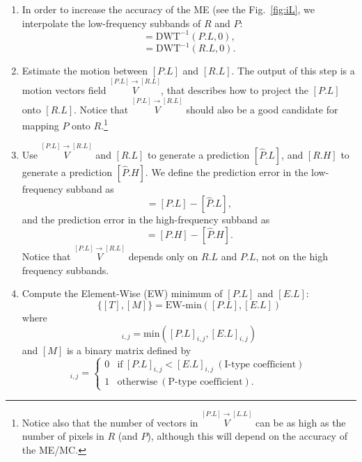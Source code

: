 \begin{enumerate}

\item In order to increase the accuracy of the ME (see the
  Fig.~\ref{fig:iL}, we interpolate the low-frequency subbands of $R$
  and $P$:
  \begin{equation}
    [P.L] = \text{DWT}^{-1}(P.L, 0),
  \end{equation}
  \begin{equation}
    [R.L] = \text{DWT}^{-1}(R.L, 0).
  \end{equation}

\item Estimate the motion between $[P.L]$ and $[R.L]$.
  The output of this step is a motion vectors field
  $\overset{[P.L]\rightarrow [R.L]}{V}$, that describes how to project
  the $[P.L]$ onto $[R.L]$. Notice that $\overset{[P.L]\rightarrow
  [R.L]}{V}$ should also be a good candidate for mapping $P$ onto
  $R$.\footnote{Notice also that the number of vectors in
  $\overset{[P.L]\rightarrow [L.L]}{V}$ can be as high as the number
  of pixels in $R$ (and $P$), although this will depend on the
  accuracy of the ME/MC.}
  
\item Use $\overset{[P.L]\rightarrow [R.L]}{V}$ and $[R.L]$ to
  generate a prediction $[\hat{P}.L]$, and $[R.H]$ to generate a
  prediction $[\hat{P}.H]$. We define the prediction error in the
  low-frequency subband as
  \begin{equation}
    [E.L] = [P.L] - [\hat{P}.L],
    \label{eq:prediction_error_L}
  \end{equation}
  and the prediction error in the high-frequency subband
  as
  \begin{equation}
    [E.H] = [P.H] - [\hat{P}.H].
    \label{eq:prediction_error}
  \end{equation}
  Notice that $\overset{[P.L]\rightarrow [R.L]}{V}$ depends only on
  $R.L$ and $P.L$, not on the high frequency subbands.

\item Compute the Element-Wise (EW) minimum of $[P.L]$ and $[E.L]$:
  \begin{equation}
    \{[T],[M]\} = \text{EW-min}([P.L], [E.L])
    \label{eq:EW-min}
  \end{equation}
  where
  \begin{equation}
    [T]_{i,j}=\text{min}([P.L]_{i,j}, [E.L]_{i,j})
  \end{equation}
  and $[M]$ is a binary matrix defined by
  \begin{equation}
    [M]_{i,j} = \left\{
      \begin{array}{ll}
        0 & \text{if}~[P.L]_{i,j} < [E.L]_{i,j} ~(\text{I-type~coefficient})\\
        1 & \text{otherwise}~(\text{P-type~coefficient}).
      \end{array}
    \right.
    \label{eq:matrix}
  \end{equation}
  

\end{enumerate}
